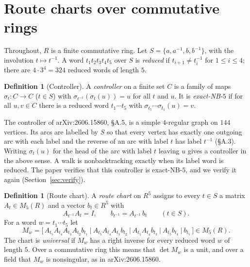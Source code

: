\documentclass[11pt]{article}
\theoremstyle{definition}
\newtheorem{definition}[theorem]{Definition}
\theoremstyle{remark}
\begin{document}
\section{Route charts over commutative rings}\label{sec:lift}

Throughout, $R$ is a finite commutative ring. Let $S=\{a,a^{-1},b,b^{-1}\}$,
with the involution $t\mapsto t^{-1}$. A word $t_1t_2t_3t_4t_5$ over $S$ is
\emph{reduced} if $t_{i+1}\ne t_i^{-1}$ for $1\le i\le 4$; there are
$4\cdot 3^4=324$ reduced words of length $5$.

\begin{definition}[Controller]
A \emph{controller} on a finite set $C$ is a family of maps
$\sigma_t\colon C\to C$ ($t\in S$) with
$\sigma_{t^{-1}}(\sigma_t(u))=u$ for all $t$ and $u$. It is
\emph{exact-NB-$5$} if for all $u,v\in C$ there is a reduced word
$t_1\cdots t_5$ with $\sigma_{t_5}\cdots\sigma_{t_1}(u)=v$.
\end{definition}

The controller of arXiv:2606.15860, \S A.5, is a simple $4$-regular graph on
$144$ vertices. Its arcs are labelled by $S$ so that every vertex has
exactly one outgoing arc with each label and the reverse of an arc with label
$t$ has label $t^{-1}$ (\S A.3). Writing $\sigma_t(u)$ for the head of the arc
with label $t$ leaving $u$ gives a controller in the above sense. A walk is
nonbacktracking exactly when its label word is reduced. The paper verifies
that this controller is exact-NB-$5$, and we verify it again
(Section~\ref{sec:verify}).

\begin{definition}[Route chart]\label{def:chart}
A \emph{route chart} on $R^5$ assigns to every $t\in S$ a matrix
$A_t\in M_5(R)$ and a vector $b_t\in R^5$ with
\begin{equation}\label{eq:A1}
  A_{t^{-1}}A_t = I, \qquad b_{t^{-1}} = A_{t^{-1}}\,b_t \qquad (t\in S).
\end{equation}
For a word $w=t_1\cdots t_5$ let
\begin{equation}\label{eq:A2}
  M_w=\bigl[\,A_{t_5}A_{t_4}A_{t_3}A_{t_2}b_{t_1}\ \big|\ A_{t_5}A_{t_4}A_{t_3}b_{t_2}\ \big|\
  A_{t_5}A_{t_4}b_{t_3}\ \big|\ A_{t_5}b_{t_4}\ \big|\ b_{t_5}\,\bigr]\in M_5(R).
\end{equation}
The chart is \emph{universal} if $M_w$ has a right inverse for every reduced
word $w$ of length $5$. Over a commutative ring this means that $\det M_w$
is a unit, and over a field that $M_w$ is nonsingular, as in
arXiv:2606.15860.
\end{definition}
\end{document}
